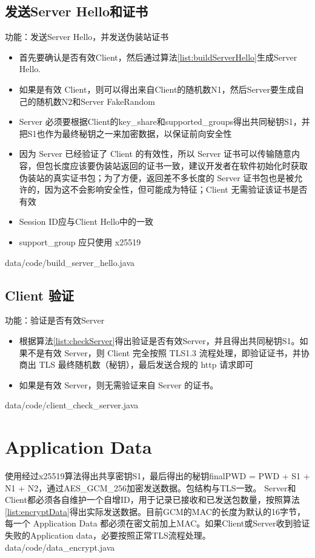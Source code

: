 \subsection{发送Server Hello和证书}
功能：发送Server Hello，并发送伪装站证书
\begin{itemize}
	\item 首先要确认是否有效Client，然后通过算法\ref{list:buildServerHello}生成Server Hello.

	\item 如果是有效 Client，则可以得出来自Client的随机数N1，然后Server要生成自己的随机数N2和Server FakeRandom

	\item Server 必须要根据Client的key\_share和supported\_groups得出共同秘钥S1，并把S1也作为最终秘钥之一来加密数据，以保证前向安全性

	\item 因为 Server 已经验证了 Client 的有效性，所以 Server 证书可以传输随意内容，但包长度应该要伪装站返回的证书一致，建议开发者在软件初始化时获取伪装站的真实证书包；为了方便，返回差不多长度的 Server 证书包也是被允许的，因为这不会影响安全性，但可能成为特征；Client 无需验证该证书是否有效

	\item Session ID应与Client Hello中的一致
	\item support\_group 应只使用 x25519
\end{itemize}
 {data/code/build_server_hello.java}

\subsection{Client 验证}
功能：验证是否有效Server
\begin{itemize}
	\item 根据算法\ref{list:checkServer}得出验证是否有效Server，并且得出共同秘钥S1。如果不是有效 Server，则 Client 完全按照 TLS1.3 流程处理，即验证证书，并协商出 TLS 最终随机数（秘钥），最后发送合规的 http 请求即可

	\item 如果是有效 Server，则无需验证来自 Server 的证书。
\end{itemize}
 {data/code/client_check_server.java}

\section{Application Data}
使用经过x25519算法得出共享密钥S1，最后得出的秘钥finalPWD = PWD + S1 + N1 + N2，通过AES\_GCM\_256加密发送数据。包结构与TLS一致。
Server和Client都必须各自维护一个自增ID，用于记录已接收和已发送包数量，按照算法\ref{list:encryptData}得出实际发送数据。目前GCM的MAC的长度为默认的16字节，每一个 Application Data 都必须在密文前加上MAC。如果Client或Server收到验证失败的Application data，必要按照正常TLS流程处理。
 {data/code/data_encrypt.java}

